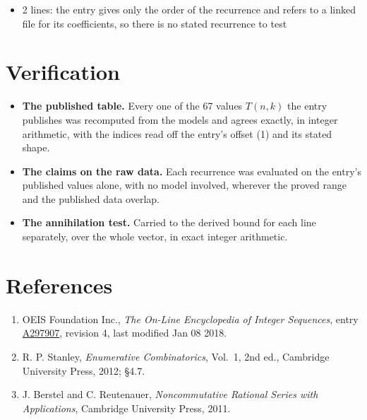 \documentclass[11pt]{article}
\theoremstyle{definition}
\begin{document}
\begin{itemize}

\item 2 lines: the entry gives only the order of the recurrence and refers to a linked file for its coefficients, so there is no stated recurrence to test

\end{itemize}

\section{Verification}

\begin{itemize}

\item {\bfseries The published table.} Every one of the 67 values $T(n,k)$ the entry publishes was recomputed from the models and agrees exactly, in integer arithmetic, with the indices read off the entry's offset (1) and its stated shape.

\item {\bfseries The claims on the raw data.} Each recurrence was evaluated on the entry's published values alone, with no model involved, wherever the proved range and the published data overlap.

\item {\bfseries The annihilation test.} Carried to the derived bound for each line separately, over the whole vector, in exact integer arithmetic.

\end{itemize}

\section{References}

\begin{enumerate}

\item OEIS Foundation Inc., \emph{The On-Line Encyclopedia of Integer Sequences}, entry \href{https://oeis.org/A297907}{A297907}, revision 4, last modified Jan 08 2018.

\item R. P. Stanley, \emph{Enumerative Combinatorics}, Vol.~1, 2nd ed., Cambridge University Press, 2012; \S4.7.

\item J. Berstel and C. Reutenauer, \emph{Noncommutative Rational Series with Applications}, Cambridge University Press, 2011.

\end{enumerate}
\end{document}
